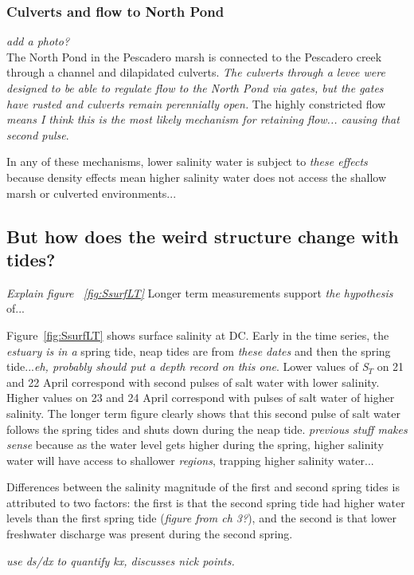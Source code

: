 \subsubsection{Culverts and flow to North Pond}
\emph{add a photo?}\\
The North Pond in the Pescadero marsh is connected to the Pescadero creek through a channel and dilapidated culverts. \emph{The culverts through a levee were designed to be able to regulate flow to the North Pond via gates, but the gates have rusted and culverts remain perennially open.} The highly constricted flow \emph{means I think this is the most likely mechanism for retaining flow... causing that second pulse}.  

In any of these mechanisms, lower salinity water is subject to \emph{these effects} because density effects mean higher salinity water does not access the shallow marsh or culverted environments... 

\subsection{But how does the weird structure change with tides?}
\emph{Explain figure ~\ref{fig:SsurfLT}}
Longer term measurements support \emph{the hypothesis} of...

Figure~\ref{fig:SsurfLT} shows surface salinity at DC. Early in the time series, the \emph{estuary is in a} spring tide, neap tides are from \emph{these dates} and then the spring tide...\emph{eh, probably should put a depth record on this one}. Lower values of \emph{S$_T$} on 21 and 22 April correspond with second pulses of salt water with lower salinity. Higher values on 23 and 24 April correspond with pulses of salt water of higher salinity. The longer term figure clearly shows that this second pulse of salt water follows the spring tides and shuts down during the neap tide. \emph{previous stuff makes sense} because as the water level gets higher during the spring, higher salinity water will have access to shallower \emph{regions}, trapping higher salinity water... 

Differences between the salinity magnitude of the first and second spring tides is attributed to two factors: the first is that the second spring tide had higher water levels than the first spring tide (\emph{figure from ch 3?}), and the second is that lower freshwater discharge was present during the second spring. 



\emph{use ds/dx to quantify kx, discusses nick points.}
